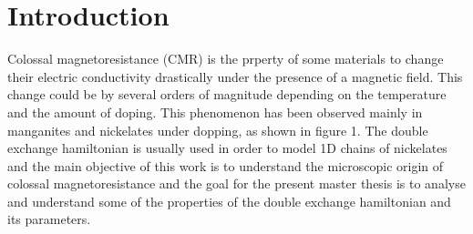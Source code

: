 \documentclass[12pt,twoside]{report}
\begin{document}
	\thispagestyle{empty}
	\tableofcontents
		\thispagestyle{empty}
	\chapter*{Introduction}
	\setcounter{page}{1}
	
	Colossal magnetoresistance (CMR) is the prperty of some materials to change their
	electric conductivity drastically under the presence of a magnetic field.
	This change could be by several orders of magnitude depending on the
	temperature and the amount of doping. This phenomenon has been observed
	mainly in manganites and nickelates under dopping, as shown in figure 1. The
	double exchange hamiltonian is usually used in order to model 1D chains of
	nickelates and the main objective of this work is to understand the
	microscopic origin of colossal magnetoresistance and the goal for the
	present master thesis is to analyse and understand some of the properties of
	the double exchange hamiltonian and its parameters.
	 
\end{document}
